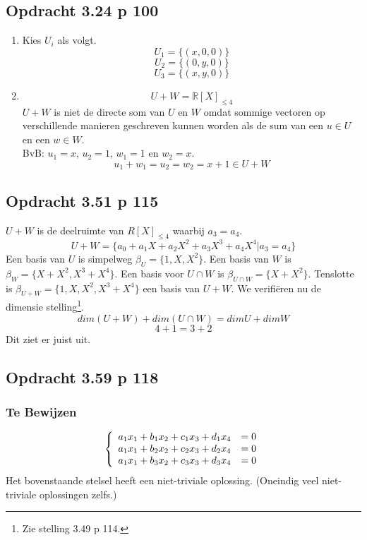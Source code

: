 \documentclass[lineaire_algebra_oplossingen.tex]{subfiles}
\begin{document}
\subsection{Opdracht 3.24 p 100}
\begin{enumerate}
\item
Kies $U_i$ als volgt.
$$U_1 = \{(x,0,0)\} $$
$$U_2 =  \{ (0,y,0)\} $$
$$U_3 = \{ (x,y,0)\} $$

\item
\[
U + W = \mathbb{R}[X]_{\le 4}
\]
$U+W$ is niet de directe som van $U$ en $W$ omdat sommige vectoren op verschillende manieren geschreven kunnen worden als de sum van een $u\in U$ en een $w\in W$.\\
BvB:
$u_1 = x$, $u_2 = 1$, $w_1 = 1$ en $w_2 = x$.
\[
u_1 + w_1 = u_2 = w_2 = x+1 \in U+W
\]
\end{enumerate}

\subsection{Opdracht 3.51 p 115}
$U+W$ is de deelruimte van $R[X]_{\le4}$ waarbij $a_3 = a_4$.
\[U+W = \{a_0 + a_1 X + a_2 X^2 +a_3 X^3 + a_4 X^4 | a_3 = a_4\}\]
Een basis van $U$ is simpelweg $\beta_U = \{1,X,X^2\}$. Een basis van $W$ is $\beta_W = \{X+X^2,X^3+X^4\}$. Een basis voor $U\cap W$ is $\beta_{U\cap W} = \{X+X^2\}$. Tenslotte is $\beta_{U+W} = \{1,X,X^2,X^3+X^4\}$ een basis van $U+W$. We verifi\"eren nu de dimensie stelling\footnote{Zie stelling 3.49 p 114.}.
\[
dim(U+W) + dim(U\cap W) = dimU+dimW
\]
\[
4 + 1 = 3+2
\]
Dit ziet er juist uit.

\subsection{Opdracht 3.59 p 118}
\subsubsection*{Te Bewijzen}
\[
\left\lbrace
\begin{array}{c c}
a_1x_1 + b_1x_2 + c_1x_3 + d_1x_4 &= 0 \\
a_1x_1 + b_2x_2+ c_2x_3 + d_2x_4 &= 0 \\
a_1x_1 + b_3x_2+ c_3x_3 + d_3x_4 &= 0 \\
\end{array}
\right.
\]
Het bovenstaande stelsel heeft een niet-triviale oplossing. (Oneindig veel niet-triviale oplossingen zelfs.)
\end{document}
